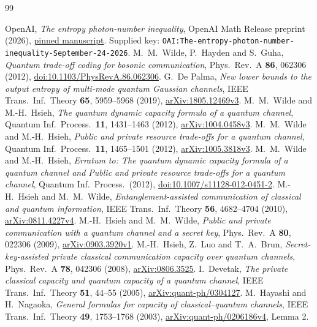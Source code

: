\documentclass[11pt]{article}
\begin{document}
\begin{thebibliography}{99}
\raggedright
{} OpenAI, \emph{The entropy photon-number inequality},
OpenAI Math Release preprint (2026),
\href{https://github.com/openai/math/blob/adc7f1241b42e322a6451854ab7e4b4c146bf78a/preprints/The-entropy-photon-number-inequality-September-24-2026/paper.pdf}{pinned manuscript}.
Supplied key: \texttt{OAI:The-entropy-photon-number-inequality-September-24-2026}.
 M.~M.~Wilde, P.~Hayden and S.~Guha,
\emph{Quantum trade-off coding for bosonic communication},
Phys.\ Rev.\ A \textbf{86}, 062306 (2012),
\href{https://doi.org/10.1103/PhysRevA.86.062306}{doi:10.1103/PhysRevA.86.062306}.
 G.~De Palma, \emph{New lower bounds to the output entropy
of multi-mode quantum Gaussian channels}, IEEE Trans.\ Inf.\ Theory
\textbf{65}, 5959--5968 (2019),
\href{https://arxiv.org/abs/1805.12469v3}{arXiv:1805.12469v3}.
 M.~M.~Wilde and M.-H.~Hsieh,
\emph{The quantum dynamic capacity formula of a quantum channel},
Quantum Inf.\ Process.\ \textbf{11}, 1431--1463 (2012),
\href{https://arxiv.org/abs/1004.0458v3}{arXiv:1004.0458v3}.
 M.~M.~Wilde and M.-H.~Hsieh,
\emph{Public and private resource trade-offs for a quantum channel},
Quantum Inf.\ Process.\ \textbf{11}, 1465--1501 (2012),
\href{https://arxiv.org/abs/1005.3818v3}{arXiv:1005.3818v3}.
 M.~M.~Wilde and M.-H.~Hsieh, \emph{Erratum to:
The quantum dynamic capacity formula of a quantum channel and
Public and private resource trade-offs for a quantum channel},
Quantum Inf.\ Process.\ (2012),
\href{https://doi.org/10.1007/s11128-012-0451-2}{doi:10.1007/s11128-012-0451-2}.
 M.-H.~Hsieh and M.~M.~Wilde,
\emph{Entanglement-assisted communication of classical and quantum
information}, IEEE Trans.\ Inf.\ Theory \textbf{56}, 4682--4704 (2010),
\href{https://arxiv.org/abs/0811.4227v4}{arXiv:0811.4227v4}.
 M.-H.~Hsieh and M.~M.~Wilde,
\emph{Public and private communication with a
quantum channel and a secret key}, Phys.\ Rev.\ A \textbf{80},
022306 (2009), \href{https://arxiv.org/abs/0903.3920v1}{arXiv:0903.3920v1}.
 M.-H.~Hsieh, Z.~Luo and T.~A.~Brun,
\emph{Secret-key-assisted private classical communication capacity
over quantum channels}, Phys.\ Rev.\ A \textbf{78}, 042306 (2008),
\href{https://arxiv.org/abs/0806.3525}{arXiv:0806.3525}.
 I.~Devetak, \emph{The private classical capacity and
quantum capacity of a quantum channel}, IEEE Trans.\ Inf.\ Theory
\textbf{51}, 44--55 (2005),
\href{https://arxiv.org/abs/quant-ph/0304127}{arXiv:quant-ph/0304127}.
 M.~Hayashi and H.~Nagaoka, \emph{General formulas for
capacity of classical--quantum channels}, IEEE Trans.\ Inf.\ Theory
\textbf{49}, 1753--1768 (2003),
\href{https://arxiv.org/abs/quant-ph/0206186v4}{arXiv:quant-ph/0206186v4}, Lemma 2.
\end{thebibliography}
\end{document}
